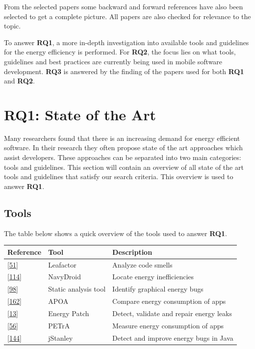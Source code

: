 \documentclass[]{book}
\begin{document}
From the selected papers some backward and forward references have also
been selected to get a complete picture. All papers are also checked for
relevance to the topic.

To answer \textbf{RQ1}, a more in-depth investigation into available
tools and guidelines for the energy efficiency is performed. For
\textbf{RQ2}, the focus lies on what tools, guidelines and best
practices are currently being used in mobile software development.
\textbf{RQ3} is answered by the finding of the papers used for both
\textbf{RQ1} and \textbf{RQ2}.

\section{RQ1: State of the Art}\label{rq1-state-of-the-art}

Many researchers found that there is an increasing demand for energy
efficient software. In their research they often propose state of the
art approaches which assist developers. These approaches can be
separated into two main categories: tools and guidelines. This section
will contain an overview of all state of the art tools and guidelines
that satisfy our search criteria. This overview is used to answer
\textbf{RQ1}.

\subsection{Tools}\label{tools}

The table below shows a quick overview of the tools used to answer
\textbf{RQ1}.

\begin{longtable}[]{@{}lll@{}}
\toprule
Reference & Tool & Description\tabularnewline
\midrule
\endhead
{[}\protect\hyperlink{ref-CA2018}{51}{]} & Leafactor & Analyze code
smells\tabularnewline
{[}\protect\hyperlink{ref-LWXM2017}{114}{]} & NavyDroid & Locate energy
inefficiencies\tabularnewline
{[}\protect\hyperlink{ref-KKK2016}{98}{]} & Static analysis tool &
Identify graphical energy bugs\tabularnewline
{[}\protect\hyperlink{ref-SKHA2018}{162}{]} & APOA & Compare energy
consumption of apps\tabularnewline
{[}\protect\hyperlink{ref-BCBR2017}{13}{]} & Energy Patch & Detect,
validate and repair energy leaks\tabularnewline
{[}\protect\hyperlink{ref-NPPPZL2017B}{56}{]} & PETrA & Measure energy
consumption of apps\tabularnewline
{[}\protect\hyperlink{ref-PSCS2018}{144}{]} & jStanley & Detect and
improve energy bugs in Java\tabularnewline
\bottomrule
\end{longtable}
\end{document}
